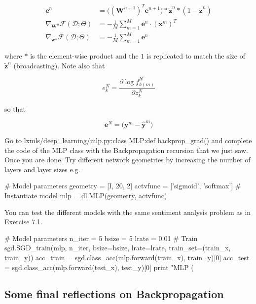 \begin{align}
\mathbf{e}^{n} & = \Big((\mathbf{W}^{n+1})^T \mathbf{e}^{n+1}\Big) \ast \tilde{\mathbf{z}}^n \ast (1-\tilde{\mathbf{z}}^n)\\
\nabla_{\mathbf{W}^n}\mathcal{F}(\mathcal{D};\Theta) & = - \frac1M \sum_{m=1}^M \mathbf{e}^{n} \cdot \left(\mathbf{x}^m\right)^T \\ 
\nabla_{\mathbf{w}^n}\mathcal{F}(\mathcal{D};\Theta) & = - \frac1M \sum_{m=1}^M \mathbf{e}^{n}  
\end{align}

\noindent where $\ast$ is the element-wise product and the $1$ is replicated to match the size of $\tilde{\mathbf{z}}^n$ (broadcasting). Note also that 

\begin{equation}
e^N_k = \frac{\partial \log f_{k(m)}^N}{\partial z^{N}_{k}}  
\label{eq:finalError}
\end{equation}

\noindent so that

\begin{equation}
\mathbf{e}^N =\Big(\mathbf{y}^m - \hat{\mathbf{y}}^m \Big)  
\end{equation}

\begin{exercise}
Go to lxmls/deep\_learning/mlp.py:class MLP:def backprop\_grad() and complete the code of the MLP class with the Backpropagation recursion that we just saw. Once you are done. Try different network geometries by increasing the number of layers and layer sizes e.g.
\begin{python}
# Model parameters
geometry = [I, 20, 2]
actvfunc = ['sigmoid', 'softmax'] 
# Instantiate model
mlp      = dl.MLP(geometry, actvfunc) 
\end{python}
You can test the different models with the same sentiment analysis problem as in Exercise 7.1. 
\begin{python}
# Model parameters
n_iter = 5
bsize  = 5
lrate  = 0.01
# Train
sgd.SGD_train(mlp, n_iter, bsize=bsize, lrate=lrate, train_set=(train_x, train_y))
acc_train = sgd.class_acc(mlp.forward(train_x), train_y)[0]
acc_test  = sgd.class_acc(mlp.forward(test_x), test_y)[0]
print "MLP (%
\end{python}
\end{exercise}

\subsection{Some final reflections on Backpropagation}

